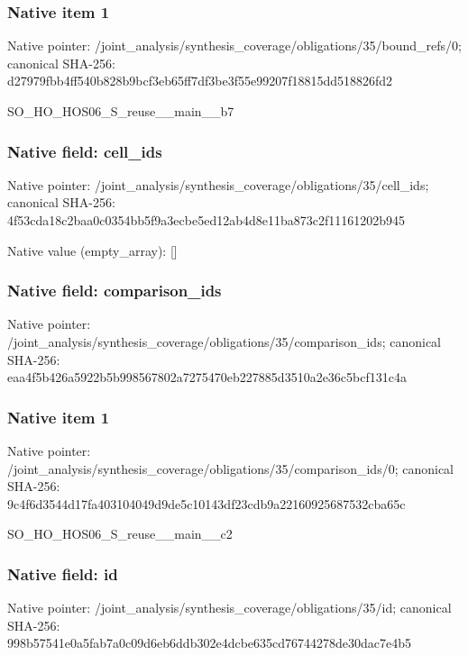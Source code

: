 \documentclass[10pt,a4paper]{article}
\begin{document}
\subsubsection{Native item 1}
Native pointer: /joint\_\allowbreak{}analysis/synthesis\_\allowbreak{}coverage/obligations/35/bound\_\allowbreak{}refs/0; canonical SHA-256: d27979fbb4ff540b828b9bcf3eb65ff7df3be3f55e99207f18815dd518826fd2

\begingroup\raggedright\sloppy SO\_\allowbreak{}HO\_\allowbreak{}HOS06\_\allowbreak{}S\_\allowbreak{}reuse\_\allowbreak{}\_\allowbreak{}main\_\allowbreak{}\_\allowbreak{}b7\par\endgroup

\subsubsection{Native field: cell\_\allowbreak{}ids}
Native pointer: /joint\_\allowbreak{}analysis/synthesis\_\allowbreak{}coverage/obligations/35/cell\_\allowbreak{}ids; canonical SHA-256: 4f53cda18c2baa0c0354bb5f9a3ecbe5ed12ab4d8e11ba873c2f11161202b945

Native value (empty\_\allowbreak{}array): []

\subsubsection{Native field: comparison\_\allowbreak{}ids}
Native pointer: /joint\_\allowbreak{}analysis/synthesis\_\allowbreak{}coverage/obligations/35/comparison\_\allowbreak{}ids; canonical SHA-256: eaa4f5b426a5922b5b998567802a7275470eb227885d3510a2e36c5bcf131c4a

\subsubsection{Native item 1}
Native pointer: /joint\_\allowbreak{}analysis/synthesis\_\allowbreak{}coverage/obligations/35/comparison\_\allowbreak{}ids/0; canonical SHA-256: 9c4f6d3544d17fa403104049d9de5c10143df23cdb9a22160925687532cba65c

\begingroup\raggedright\sloppy SO\_\allowbreak{}HO\_\allowbreak{}HOS06\_\allowbreak{}S\_\allowbreak{}reuse\_\allowbreak{}\_\allowbreak{}main\_\allowbreak{}\_\allowbreak{}c2\par\endgroup

\subsubsection{Native field: id}
Native pointer: /joint\_\allowbreak{}analysis/synthesis\_\allowbreak{}coverage/obligations/35/id; canonical SHA-256: 998b57541e0a5fab7a0c09d6eb6ddb302e4dcbe635cd76744278de30dac7e4b5
\end{document}
